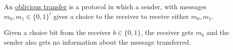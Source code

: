 \begin{definition}
    An \ul{oblivious transfer} is a protocol in which a sender, with messages $m_0, m_1\in\{0, 1\}^l$ gives a choice to the receiver to receive either $m_0, m_1$.

    Given a choice bit from the receiver $b\in\{0,1\}$, the receiver gets $m_b$ and the sender also gets no information about the message transferred.


\end{definition}
